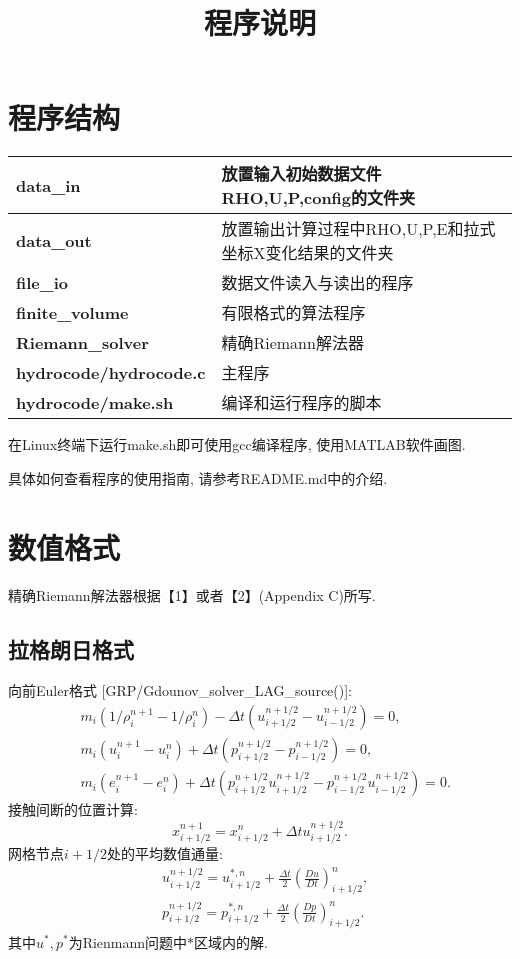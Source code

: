 \documentclass[CJK]{ctexart}
\begin{document}
\title{程序说明}
\date{}
\maketitle


\section{程序结构}

\begin{table}[htbp]
\begin{tabular}{|l|l|}
\hline
\textbf{data\_in}  & 放置输入初始数据文件RHO,U,P,config的文件夹\\
\hline
\textbf{data\_out} & 放置输出计算过程中RHO,U,P,E和拉式坐标X变化结果的文件夹\\
\hline
\textbf{file\_io}  & 数据文件读入与读出的程序\\
\hline
\textbf{finite\_volume}  & 有限格式的算法程序\\
\hline
\textbf{Riemann\_solver} & 精确Riemann解法器\\
\hline
\textbf{hydrocode/hydrocode.c} & 主程序\\
\hline
\textbf{hydrocode/make.sh}     & 编译和运行程序的脚本\\
\hline
\end{tabular}
\end{table}

在Linux终端下运行make.sh即可使用gcc编译程序, 使用MATLAB软件画图.

具体如何查看程序的使用指南, 请参考README.md中的介绍.


\section{数值格式}

精确Riemann解法器根据【1】或者【2】(Appendix C)所写.

\subsection{拉格朗日格式}

向前Euler格式 [GRP/Gdounov\_solver\_LAG\_source()]:
\begin{align*}
& m_i(1/\rho_i^{n+1}-1/\rho_i^{n})-\Delta t(u_{i+1/2}^{n+1/2}-u_{i-1/2}^{n+1/2})=0,\\
& m_i(u_i^{n+1}-u_i^{n})+\Delta t(p_{i+1/2}^{n+1/2}-p_{i-1/2}^{n+1/2})=0,\\
& m_i(e_i^{n+1}-e_i^{n})+\Delta t(p_{i+1/2}^{n+1/2} u_{i+1/2}^{n+1/2}-p_{i-1/2}^{n+1/2} u_{i-1/2}^{n+1/2})=0.
\end{align*}
接触间断的位置计算:
$$
x_{i+1/2}^{n+1}=x_{i+1/2}^{n}+\Delta t u_{i+1/2}^{n+1/2}.
$$
网格节点$i+1/2$处的平均数值通量:
\begin{align*}
& u_{i+1/2}^{n+1/2}=u_{i+1/2}^{*,n}+\frac{\Delta t}{2}\left(\frac{D u}{D t}\right)_{i+1/2}^{n}, \\
& p_{i+1/2}^{n+1/2}=p_{i+1/2}^{*,n}+\frac{\Delta t}{2}\left(\frac{D p}{D t}\right)_{i+1/2}^{n}.
\end{align*}
其中$u^{*},p^{*}$为Rienmann问题中$*$区域内的解.
\end{document}
